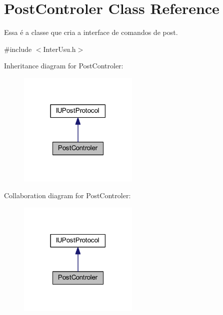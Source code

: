 \hypertarget{class_post_controler}{\section{Post\-Controler Class Reference}
\label{class_post_controler}
}


Essa é a classe que cria a interface de comandos de post.  




{\ttfamily \#include $<$Inter\-Usu.\-h$>$}



Inheritance diagram for Post\-Controler\-:
\nopagebreak
\begin{figure}[H]
\begin{center}
\leavevmode
\includegraphics[width=162pt]{class_post_controler__inherit__graph}
\end{center}
\end{figure}


Collaboration diagram for Post\-Controler\-:
\nopagebreak
\begin{figure}[H]
\begin{center}
\leavevmode
\includegraphics[width=162pt]{class_post_controler__coll__graph}
\end{center}
\end{figure}
